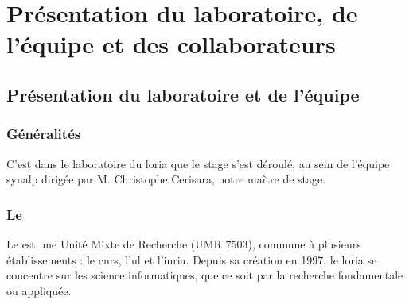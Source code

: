 

\chapter{Présentation du laboratoire, de l'équipe et des collaborateurs}
\section{Présentation du laboratoire et de l'équipe}
\subsection{Généralités}
C'est dans le laboratoire du \gls{loria} que le stage s'est déroulé, au sein de l'équipe \gls{synalp} dirigée par M. Christophe Cerisara, notre maître de stage.

\subsection{Le }
Le  est une Unité Mixte de Recherche (UMR 7503), commune à plusieurs établissements : le \gls{cnrs}, l’\gls{ul} et l'\gls{inria}.
Depuis sa création en 1997, le \gls{loria} se concentre sur les science informatiques, que ce soit par la recherche fondamentale ou appliquée.

